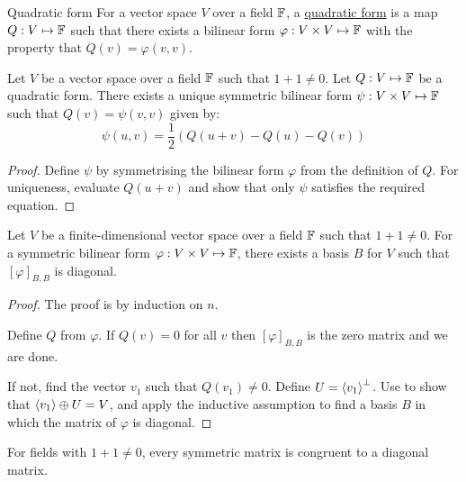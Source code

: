 \documentclass[../Main.tex]{subfiles}
\begin{document}
\begin{definition}{Quadratic form}
    For a vector space $V$ over a field $\mathbb{F}$, a \underline{quadratic form} is a map $Q : V \mapsto \mathbb{F}$ such that there exists a bilinear form $\varphi : V \times V \mapsto \mathbb{F}$ with the property that $Q(v) = \varphi(v, v)$.
\end{definition}
\begin{proposition}
    Let $V$ be a vector space over a field $\mathbb{F}$ such that $1 + 1 \neq 0$. Let $Q : V \mapsto \mathbb{F}$ be a quadratic form. There exists a unique symmetric bilinear form $\psi : V \times V \mapsto \mathbb{F}$ such that $Q(v) = \psi(v, v)$ given by:
    \begin{equation*}
        \psi(u, v) = \frac12 \left(Q(u + v) - Q(u) - Q(v)\right)
    \end{equation*}
    \label{propPolarisationIdentity}
\end{proposition}
\begin{proof}
    Define $\psi$ by symmetrising the bilinear form $\varphi$ from the definition of $Q$. For uniqueness, evaluate $Q(u + v)$ and show that only $\psi$ satisfies the required equation.
\end{proof}
\begin{theorem}
    Let $V$ be a finite-dimensional vector space over a field $\mathbb{F}$ such that $1 + 1 \neq 0$. For a symmetric bilinear form $\varphi : V \times V \mapsto \mathbb{F}$, there exists a basis $B$ for $V$ such that $[\varphi]_{B, B}$ is diagonal.
    \label{thmSBFDiag}
\end{theorem}
\begin{proof}
    The proof is by induction on $n$.

    Define $Q$ from $\varphi$. If $Q(v) = 0$ for all $v$ then $[\varphi]_{B, B}$ is the zero matrix and we are done.

    If not, find the vector $v_1$ such that $Q(v_1) \neq 0$. Define $U = \left\langle v_1 \right\rangle^\perp$. Use  to show that $\left\langle v_1 \right\rangle \oplus U = V$, and apply the inductive assumption to find a basis $B$ in which the matrix of $\varphi$ is diagonal.
\end{proof}
\begin{corollary}
    For fields with $1 + 1 \neq 0$, every symmetric matrix is congruent to a diagonal matrix.
    \label{corSymCongDiag}
\end{corollary}
\end{document}
